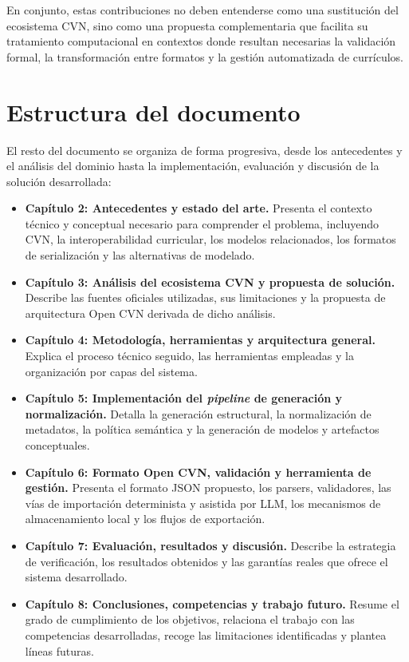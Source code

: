 En conjunto, estas contribuciones no deben entenderse como una sustitución del
ecosistema CVN, sino como una propuesta complementaria que facilita su tratamiento
computacional en contextos donde resultan necesarias la validación formal, la
transformación entre formatos y la gestión automatizada de currículos.

\section{Estructura del documento}
\label{sec:introduccion_estructura}

El resto del documento se organiza de forma progresiva, desde los antecedentes y
el análisis del dominio hasta la implementación, evaluación y discusión de la
solución desarrollada:

\begin{itemize}
  \item \textbf{Capítulo 2: Antecedentes y estado del arte.} Presenta el contexto
  técnico y conceptual necesario para comprender el problema, incluyendo CVN, la
  interoperabilidad curricular, los modelos relacionados, los formatos de
  serialización y las alternativas de modelado.

  \item \textbf{Capítulo 3: Análisis del ecosistema CVN y propuesta de solución.}
  Describe las fuentes oficiales utilizadas, sus limitaciones y la propuesta de
  arquitectura Open CVN derivada de dicho análisis.

  \item \textbf{Capítulo 4: Metodología, herramientas y arquitectura general.}
  Explica el proceso técnico seguido, las herramientas empleadas y la organización
  por capas del sistema.

  \item \textbf{Capítulo 5: Implementación del \textit{pipeline} de generación y
  normalización.} Detalla la generación estructural, la normalización de
  metadatos, la política semántica y la generación de modelos y artefactos
  conceptuales.

  \item \textbf{Capítulo 6: Formato Open CVN, validación y herramienta de
  gestión.} Presenta el formato JSON propuesto, los parsers, validadores, las
  vías de importación determinista y asistida por LLM, los mecanismos de
  almacenamiento local y los flujos de exportación.

  \item \textbf{Capítulo 7: Evaluación, resultados y discusión.} Describe la
  estrategia de verificación, los resultados obtenidos y las garantías reales que
  ofrece el sistema desarrollado.

  \item \textbf{Capítulo 8: Conclusiones, competencias y trabajo futuro.} Resume
  el grado de cumplimiento de los objetivos, relaciona el trabajo con las
  competencias desarrolladas, recoge las limitaciones identificadas y plantea
  líneas futuras.
\end{itemize}
